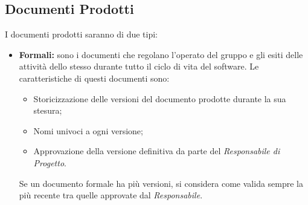 \subsection{Documenti Prodotti}
I documenti prodotti saranno di due tipi:
\begin{itemize}
    \item \textbf{Formali:} sono i documenti che regolano l'operato del gruppo e gli esiti delle attività dello stesso durante tutto il ciclo di vita del software.
    Le caratteristiche di questi documenti sono:
    \begin{itemize}
        \item Storicizzazione delle versioni del documento prodotte durante la sua stesura;
        \item Nomi univoci a ogni versione;
        \item Approvazione della versione definitiva da parte del \textit{Responsabile di Progetto}.
    \end{itemize}
    Se un documento formale ha più versioni, si considera come valida sempre la più recente tra quelle approvate dal \textit{Responsabile}.


\end{itemize}
